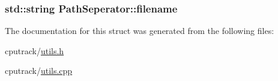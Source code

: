 \subsubsection[{\texorpdfstring{filename}{filename}}]{\setlength{\rightskip}{0pt plus 5cm}std\+::string Path\+Seperator\+::filename}\hypertarget{struct_path_seperator_a969fd95b83c553bf3e355c657ed742af}{}\label{struct_path_seperator_a969fd95b83c553bf3e355c657ed742af}


The documentation for this struct was generated from the following files\+:\begin{DoxyCompactItemize}
\item 
cputrack/\hyperlink{utils_8h}{utils.\+h}\item 
cputrack/\hyperlink{utils_8cpp}{utils.\+cpp}\end{DoxyCompactItemize}
